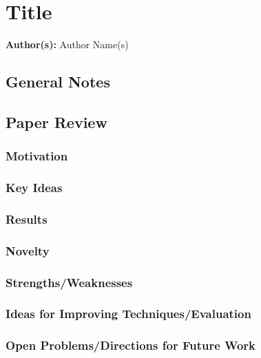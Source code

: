 \section{Title}

\textbf{Author(s):} Author Name(s)

\subsection{General Notes}


\subsection{Paper Review}

\subsubsection{Motivation}


\subsubsection{Key Ideas}


\subsubsection{Results}


\subsubsection{Novelty}


\subsubsection{Strengths/Weaknesses}


\subsubsection{Ideas for Improving Techniques/Evaluation}


\subsubsection{Open Problems/Directions for Future Work}

